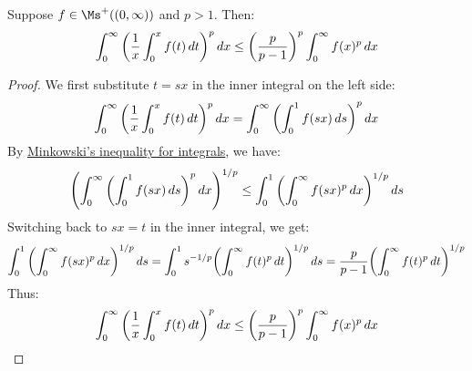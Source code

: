 \documentclass[main.tex]{subfiles}
\begin{document}
\begin{theorem}\label{hardys_inequality_for_integrals}
    Suppose $f\in\Ms^+((0,\infty))$ and $p>1$. Then:
    \begin{equation*}
        \int_0^\infty \qty(\frac{1}{x}\int_0^x f(t)\,dt)^p\,dx
        \le \qty(\frac{p}{p-1})^p\int_0^\infty f(x)^p\,dx
    \end{equation*}
\end{theorem}
\begin{proof}
    We first substitute $t=sx$ in the inner integral on the left side:
    \begin{equation*}
        \int_0^\infty \qty(\frac{1}{x}\int_0^x f(t)\,dt)^p\,dx
        = \int_0^\infty \qty(\int_0^1 f(sx)\,ds)^p\,dx
    \end{equation*}
    By \hyperref[minkowskis_inequality_for_integrals]{Minkowski's inequality for integrals}, we have:
    \begin{equation*}
        \qty(\int_0^\infty \qty(\int_0^1 f(sx)\,ds)^p\,dx)^{1/p}
        \le \int_0^1 \qty(\int_0^\infty f(sx)^p\,dx)^{1/p}\,ds
    \end{equation*}
    Switching back to $sx=t$ in the inner integral, we get:
    \begin{equation*}
        \int_0^1 \qty(\int_0^\infty f(sx)^p\,dx)^{1/p}\,ds
        = \int_0^1 s^{-1/p}\qty(\int_0^\infty f(t)^p\,dt)^{1/p}\,ds
        = \frac{p}{p-1}\qty(\int_0^\infty f(t)^p\,dt)^{1/p}
    \end{equation*}
    Thus:
    \begin{equation*}
        \int_0^\infty \qty(\frac{1}{x}\int_0^x f(t)\,dt)^p\,dx
        \le \qty(\frac{p}{p-1})^p\int_0^\infty f(x)^p\,dx
    \end{equation*}
\end{proof}
\end{document}
